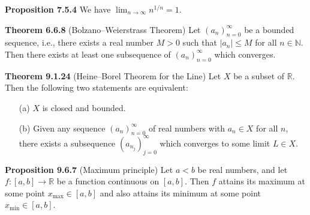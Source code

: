\documentclass{article}
\begin{document}
\medskip

\textbf{Proposition 7.5.4} We have
\(
\lim_{n \to \infty} n^{1/n} = 1.
\)

\medskip

\textbf{Theorem 6.6.8} (Bolzano–Weierstrass Theorem) Let $(a_n)_{n=0}^{\infty}$ be 
a bounded sequence, i.e., there exists a real number $M > 0$ such that 
$|a_n| \leq M$ for all $n \in \mathbb{N}$. Then there exists at least one 
subsequence of $(a_n)_{n=0}^{\infty}$ which converges.

\medskip

\textbf{Theorem 9.1.24} (Heine–Borel Theorem for the Line) Let $X$ be a subset of 
$\mathbb{R}$. Then the following two statements are equivalent:

\begin{itemize}
  \item[(a)] $X$ is closed and bounded.
  \item[(b)] Given any sequence $(a_n)_{n=0}^{\infty}$ of real numbers with 
  $a_n \in X$ for all $n$, there exists a subsequence $(a_{n_j})_{j=0}^{\infty}$ 
  which converges to some limit $L \in X$.
\end{itemize}

\medskip

\textbf{Proposition 9.6.7} (Maximum principle) Let $a < b$ be real numbers, and 
let $f : [a, b] \to \mathbb{R}$ be a function continuous on $[a, b]$. Then $f$ 
attains its maximum at some point $x_{\text{max}} \in [a, b]$ and also attains 
its minimum at some point $x_{\text{min}} \in [a, b]$.
\end{document}
